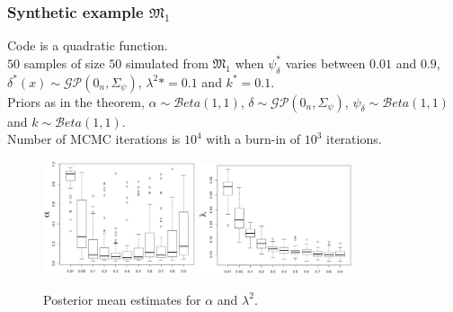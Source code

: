 \documentclass[nopagenumber,9pt]{beamer}
\newcommand\MF{{\mathfrak{M}}}
\begin{document}
  \begin{frame}
  \frametitle{Synthetic example $\MF_1$}
  Code is a quadratic function.\\
 $50$ samples of size $50$ simulated from $\MF_1$ when $\psi_\delta^*$ varies between $0.01$ and $0.9$, $\delta^*(x)\sim \mathcal{GP}(0_n, \Sigma_\psi)$, $ \lambda^2*=0.1$ and $k^*=0.1$.\\
  Priors as in the theorem, $\alpha\sim \mathcal{B}eta(1,1)$, $\delta\sim \mathcal{GP}(0_n, \Sigma_\psi)$, $\psi_\delta \sim \mathcal{B}eta(1,1)$ and  $k \sim \mathcal{B}eta(1,1)$.  \\
 Number of MCMC iterations is $10^4$ with a burn-in of $10^3$ iterations.



\begin{figure}[ht]
\includegraphics[width=0.4\textwidth]{100data_alpha_n_50_m1_uniform_gamadelta}
\includegraphics[width=0.4\textwidth]{50data_lambda_n_50_m1_uniform_gamadelta}
\caption{Posterior mean estimates for $\alpha$ and $\lambda^2$.}
\label{figure:m1_1}
\end{figure}

\end{frame}
\end{document}
